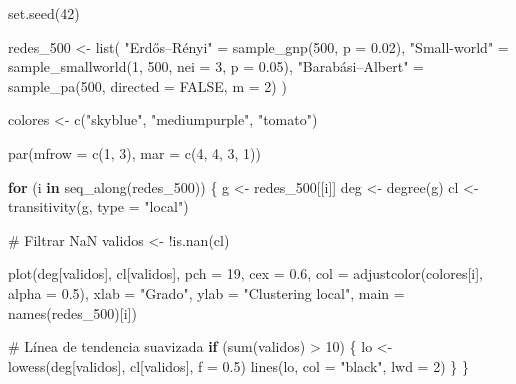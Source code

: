 \documentclass[
  letterpaper,
  DIV=11,
  numbers=noendperiod]{scrreprt}
\newenvironment{Shaded}{\begin{snugshade}}{\end{snugshade}}
\newcommand{\AttributeTok}[1]{\textcolor[rgb]{0.40,0.45,0.13}{#1}}
\newcommand{\CommentTok}[1]{\textcolor[rgb]{0.37,0.37,0.37}{#1}}
\newcommand{\ConstantTok}[1]{\textcolor[rgb]{0.56,0.35,0.01}{#1}}
\newcommand{\ControlFlowTok}[1]{\textcolor[rgb]{0.00,0.23,0.31}{\textbf{#1}}}
\newcommand{\DecValTok}[1]{\textcolor[rgb]{0.68,0.00,0.00}{#1}}
\newcommand{\FloatTok}[1]{\textcolor[rgb]{0.68,0.00,0.00}{#1}}
\newcommand{\FunctionTok}[1]{\textcolor[rgb]{0.28,0.35,0.67}{#1}}
\newcommand{\NormalTok}[1]{\textcolor[rgb]{0.00,0.23,0.31}{#1}}
\newcommand{\OtherTok}[1]{\textcolor[rgb]{0.00,0.23,0.31}{#1}}
\newcommand{\SpecialCharTok}[1]{\textcolor[rgb]{0.37,0.37,0.37}{#1}}
\newcommand{\StringTok}[1]{\textcolor[rgb]{0.13,0.47,0.30}{#1}}
\begin{document}
\begin{Shaded}
\begin{Highlighting}[]
\FunctionTok{set.seed}\NormalTok{(}\DecValTok{42}\NormalTok{)}

\NormalTok{redes\_500 }\OtherTok{\textless{}{-}} \FunctionTok{list}\NormalTok{(}
  \StringTok{"Erdős–Rényi"}     \OtherTok{=} \FunctionTok{sample\_gnp}\NormalTok{(}\DecValTok{500}\NormalTok{, }\AttributeTok{p =} \FloatTok{0.02}\NormalTok{),}
  \StringTok{"Small{-}world"}      \OtherTok{=} \FunctionTok{sample\_smallworld}\NormalTok{(}\DecValTok{1}\NormalTok{, }\DecValTok{500}\NormalTok{, }\AttributeTok{nei =} \DecValTok{3}\NormalTok{, }\AttributeTok{p =} \FloatTok{0.05}\NormalTok{),}
  \StringTok{"Barabási–Albert"}  \OtherTok{=} \FunctionTok{sample\_pa}\NormalTok{(}\DecValTok{500}\NormalTok{, }\AttributeTok{directed =} \ConstantTok{FALSE}\NormalTok{, }\AttributeTok{m =} \DecValTok{2}\NormalTok{)}
\NormalTok{)}

\NormalTok{colores }\OtherTok{\textless{}{-}} \FunctionTok{c}\NormalTok{(}\StringTok{"skyblue"}\NormalTok{, }\StringTok{"mediumpurple"}\NormalTok{, }\StringTok{"tomato"}\NormalTok{)}

\FunctionTok{par}\NormalTok{(}\AttributeTok{mfrow =} \FunctionTok{c}\NormalTok{(}\DecValTok{1}\NormalTok{, }\DecValTok{3}\NormalTok{), }\AttributeTok{mar =} \FunctionTok{c}\NormalTok{(}\DecValTok{4}\NormalTok{, }\DecValTok{4}\NormalTok{, }\DecValTok{3}\NormalTok{, }\DecValTok{1}\NormalTok{))}

\ControlFlowTok{for}\NormalTok{ (i }\ControlFlowTok{in} \FunctionTok{seq\_along}\NormalTok{(redes\_500)) \{}
\NormalTok{  g }\OtherTok{\textless{}{-}}\NormalTok{ redes\_500[[i]]}
\NormalTok{  deg }\OtherTok{\textless{}{-}} \FunctionTok{degree}\NormalTok{(g)}
\NormalTok{  cl }\OtherTok{\textless{}{-}} \FunctionTok{transitivity}\NormalTok{(g, }\AttributeTok{type =} \StringTok{"local"}\NormalTok{)}
  
  \CommentTok{\# Filtrar NaN}
\NormalTok{  validos }\OtherTok{\textless{}{-}} \SpecialCharTok{!}\FunctionTok{is.nan}\NormalTok{(cl)}
  
  \FunctionTok{plot}\NormalTok{(deg[validos], cl[validos],}
       \AttributeTok{pch =} \DecValTok{19}\NormalTok{, }\AttributeTok{cex =} \FloatTok{0.6}\NormalTok{,}
       \AttributeTok{col =} \FunctionTok{adjustcolor}\NormalTok{(colores[i], }\AttributeTok{alpha =} \FloatTok{0.5}\NormalTok{),}
       \AttributeTok{xlab =} \StringTok{"Grado"}\NormalTok{, }\AttributeTok{ylab =} \StringTok{"Clustering local"}\NormalTok{,}
       \AttributeTok{main =} \FunctionTok{names}\NormalTok{(redes\_500)[i])}
  
  \CommentTok{\# Línea de tendencia suavizada}
  \ControlFlowTok{if}\NormalTok{ (}\FunctionTok{sum}\NormalTok{(validos) }\SpecialCharTok{\textgreater{}} \DecValTok{10}\NormalTok{) \{}
\NormalTok{    lo }\OtherTok{\textless{}{-}} \FunctionTok{lowess}\NormalTok{(deg[validos], cl[validos], }\AttributeTok{f =} \FloatTok{0.5}\NormalTok{)}
    \FunctionTok{lines}\NormalTok{(lo, }\AttributeTok{col =} \StringTok{"black"}\NormalTok{, }\AttributeTok{lwd =} \DecValTok{2}\NormalTok{)}
\NormalTok{  \}}
\NormalTok{\}}
\end{Highlighting}
\end{Shaded}
\end{document}
